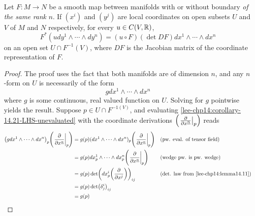 \documentclass[../main-manifolds.tex]{subfiles}
\begin{document}
    
    \begin{wts}\label{lee-chp14:corollary-14.21}
        Let $F: M\to N$ be a smooth map between manifolds with or without boundary \emph{of the same rank $n$}. If $(x^i)$ and $(y^j)$ are local coordinates on open subsets $U$ and $V$ of $M$ and $N$ respectively, for every $u\in C(V,\mathbb{R})$, 
        \[
            F^*(udy^1\wedge \cdots\wedge dy^n)= (u\circ F)(\det DF)dx^1\wedge\cdots\wedge dx^n
        \]
        on an open set $U\cap F^{-1}(V)$, where $DF$ is the Jacobian matrix of the coordinate representation of $F$. 
    \end{wts}
    \begin{proof}
        The proof uses the fact that both manifolds are of dimension $n$, and any $n$-form on $U$ is necessarily of the form
        \begin{equation}\label{lee-chp14:corollary-14.21-LHS-unevaluated}
            gdx^1\wedge\cdots\wedge dx^n
        \end{equation}
        where $g$ is some continuous, real valued function on $U$. Solving for $g$ pointwise yields the result. Suppose $p\in U\cap F^{-1(V)}$, and evaluating \cref{lee-chp14:corollary-14.21-LHS-unevaluated} with the coordinate derivations $\qty(\eval{\pdv{x^{\underline{n}}}}_p)$ reads
        \begin{align*}
            \qty(gdx^1\wedge\cdots\wedge dx^n)_p\qty(\eval{\pdv{x^{\underline{n}}}}_p) &= g(p)(dx^1\wedge\cdots\wedge dx^n)_p\qty(\eval{\pdv{x^{\underline{n}}}}_p) &&\text{(pw. eval. of tensor field)}\\
            &= g(p)dx^1_p\wedge\cdots\wedge dx^n_p\qty(\eval{\pdv{x^{\underline{n}}}}_p) && \text{(wedge pw. is pw. wedge)}\\
            &= g(p)\det(dx^i_p\qty(\pdv{x^j}))_{ij}&& \text{(det. law from \Cref{lee-chp14:lemma14.11})}\\
            &= g(p) \det(\delta^{i}_j)_{ij}\\
            &= g(p)
        \end{align*}
        

\end{proof}
\end{document}
